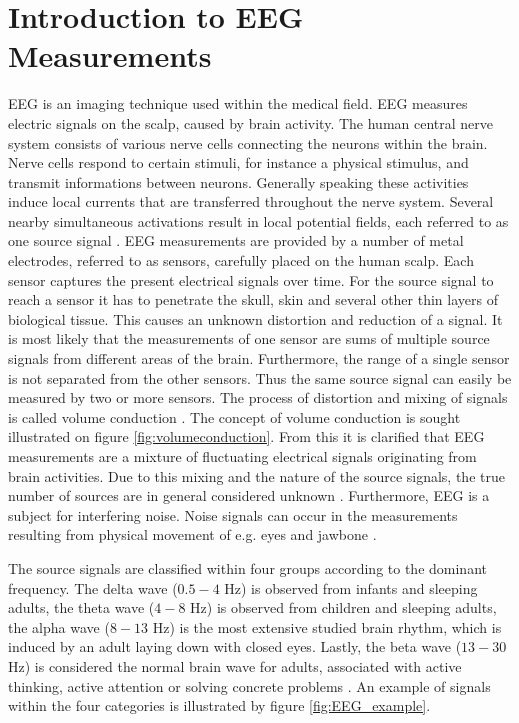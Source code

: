 \section{Introduction to EEG Measurements}\label{sec:EEG}
EEG is an imaging technique used within the medical field. EEG measures electric signals on the scalp, caused by brain activity. 
The human central nerve system consists of various nerve cells connecting the neurons within the brain. Nerve cells respond to certain stimuli, for instance a physical stimulus, and transmit informations between neurons.
Generally speaking these activities induce local currents that are transferred throughout the nerve system. 
Several nearby simultaneous activations result in local potential fields, each referred to as one source signal \cite{EEGsignalprocessing}. 
EEG measurements are provided by a number of metal electrodes, referred to as sensors, carefully placed on the human scalp. 
Each sensor captures the present electrical signals over time.
For the source signal to reach a sensor it has to penetrate the skull, skin and several other thin layers of biological tissue. 
This causes an unknown distortion and reduction of a signal.
It is most likely that the measurements of one sensor are sums of multiple source signals from different areas of the brain.
Furthermore, the range of a single sensor is not separated from the other sensors. 
Thus the same source signal can easily be measured by two or more sensors.
The process of distortion and mixing of signals is called volume conduction \cite{EEGsignalprocessing}\cite{Van2019}. 
The concept of volume conduction is sought illustrated on figure \ref{fig:volumeconduction}.
From this it is clarified that EEG measurements are a mixture of fluctuating electrical signals originating from brain activities. Due to this mixing and the nature of the source signals, the true number of sources are in general considered unknown \cite{EEGsignalprocessing}. 
Furthermore, EEG is a subject for interfering noise. Noise signals can occur in the measurements resulting from physical movement of e.g. eyes and jawbone \cite{fundamentalEEG}.

The source signals are classified within four groups according to the dominant frequency. 
The delta wave ($0.5-4$ Hz) is observed from infants and sleeping adults, the theta wave ($4-8$ Hz) is observed from children and sleeping adults, the alpha wave ($8-13$ Hz) is the most extensive studied brain rhythm, which is induced by an adult laying down with closed eyes. 
Lastly, the beta wave ($13-30$ Hz) is considered the normal brain wave for adults, associated with active thinking, active attention or solving concrete problems \cite{EEGsignalprocessing}. 
An example of signals within the four categories is illustrated by figure \ref{fig:EEG_example}. 

